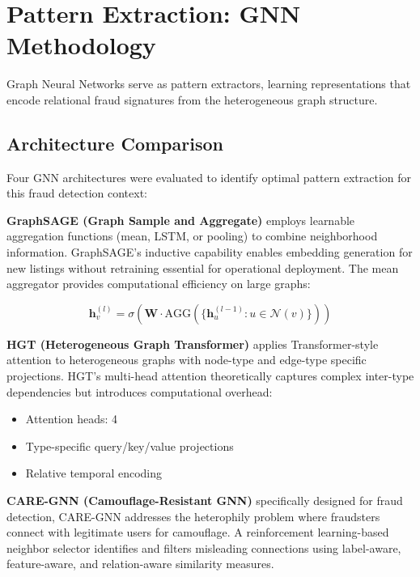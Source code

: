 \section{Pattern Extraction: GNN Methodology}
\label{sec:3_7}

Graph Neural Networks serve as pattern extractors, learning representations that encode relational fraud signatures from the heterogeneous graph structure.

\subsection{Architecture Comparison}

Four GNN architectures were evaluated to identify optimal pattern extraction for this fraud detection context:

\textbf{GraphSAGE (Graph Sample and Aggregate)} employs learnable aggregation functions (mean, LSTM, or pooling) to combine neighborhood information. GraphSAGE's inductive capability enables embedding generation for new listings without retraining essential for operational deployment. The mean aggregator provides computational efficiency on large graphs:

\begin{equation}
\mathbf{h}_v^{(l)} = \sigma\left(\mathbf{W} \cdot \text{AGG}\left(\{\mathbf{h}_u^{(l-1)} : u \in \mathcal{N}(v)\}\right)\right)
\end{equation}

\textbf{HGT (Heterogeneous Graph Transformer)} applies Transformer-style attention to heterogeneous graphs with node-type and edge-type specific projections. HGT's multi-head attention theoretically captures complex inter-type dependencies but introduces computational overhead:
\begin{itemize}
    \item Attention heads: 4
    \item Type-specific query/key/value projections
    \item Relative temporal encoding
\end{itemize}

\textbf{CARE-GNN (Camouflage-Resistant GNN)} specifically designed for fraud detection, CARE-GNN addresses the heterophily problem where fraudsters connect with legitimate users for camouflage. A reinforcement learning-based neighbor selector identifies and filters misleading connections using label-aware, feature-aware, and relation-aware similarity measures.

